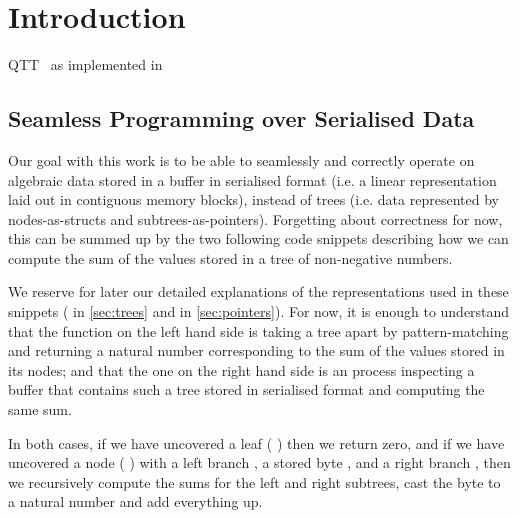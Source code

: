 \section{Introduction}



QTT~\cite{DBLP:conf/birthday/McBride16, DBLP:conf/lics/Atkey18}
as implemented in \idris{}~\cite{DBLP:conf/ecoop/Brady21}



\subsection{Seamless Programming over Serialised Data}

Our goal with this work is to be able to seamlessly and correctly
operate on algebraic data stored in a buffer in serialised format
(i.e. a linear representation laid out in contiguous memory blocks),
instead of trees
(i.e. data represented by nodes-as-structs and subtrees-as-pointers).
%
Forgetting about correctness for now, this can be summed up by the
two following code snippets describing how we can compute the sum
of the values stored in a tree of non-negative numbers.

\noindent
\begin{minipage}{.4\textwidth}
\end{minipage}
\hfill\begin{minipage}{.55\textwidth}
\end{minipage}

We reserve for later our detailed explanations of the representations
used in these snippets
( in \cref{sec:trees} and
 in \cref{sec:pointers}).
%
For now, it is enough to understand that the function on the left hand
side is taking a tree apart by pattern-matching and returning a natural
number corresponding to the sum of the values stored in its nodes;
%
and that the one on the right hand side is an  process
inspecting a buffer that contains such a tree stored in serialised format
and computing the same sum.

In both cases, if we have uncovered a leaf
({ } \IdrisKeyword{\KatlaUnderscore{}})
then we return zero,
and if we have uncovered a node
({ } \IdrisKeyword{(} \IdrisData{\#}   \IdrisData{\#} \IdrisKeyword{)})
with
a left branch ,
a stored byte ,
and a right branch ,
then we recursively compute the sums for the left and right subtrees,
cast the byte to a natural number and add everything up.

